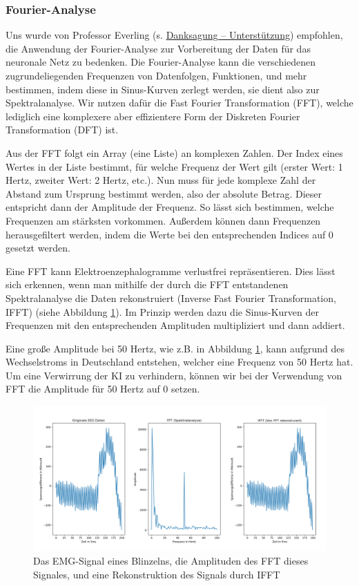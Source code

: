 \documentclass[11pt]{scrartcl}
\begin{document}
	\subsubsection{Fourier-Analyse}
	
	Uns wurde von Professor Everling (s. \hyperref[Unterstuetzung]{Danksagung -- Unterstützung}) empfohlen, die Anwendung der Fourier-Analyse zur Vorbereitung der Daten für das neuronale Netz zu bedenken. Die Fourier-Analyse kann die verschiedenen zugrundeliegenden Frequenzen von Datenfolgen, Funktionen, und mehr bestimmen, indem diese in Sinus-Kurven zerlegt werden, sie dient also zur Spektralanalyse. \cite{3b1b:fft} Wir nutzen dafür die Fast Fourier Transformation (FFT), welche lediglich eine komplexere aber effizientere Form der Diskreten Fourier Transformation (DFT) ist. \cite{FFT-DFT}

	Aus der FFT folgt ein Array (eine Liste) an komplexen Zahlen. Der Index eines Wertes in der Liste bestimmt, für welche Frequenz der Wert gilt (erster Wert: 1 Hertz, zweiter Wert: 2 Hertz, etc.). Nun muss für jede komplexe Zahl der Abstand zum Ursprung bestimmt werden, also der absolute Betrag. Dieser entspricht dann der Amplitude der Frequenz. So lässt sich bestimmen, welche Frequenzen am stärksten vorkommen. Außerdem können dann Frequenzen herausgefiltert werden, indem die Werte bei den entsprechenden Indices auf 0 gesetzt werden. 

	Eine FFT kann Elektroenzephalogramme verlustfrei repräsentieren. Dies lässt sich erkennen, wenn man mithilfe der durch die FFT entstandenen Spektralanalyse die Daten rekonstruiert (Inverse Fast Fourier Transformation, IFFT) (siehe Abbildung \ref{EEG-IFFT}). Im Prinzip werden dazu die Sinus-Kurven der Frequenzen mit den entsprechenden Amplituden multipliziert und dann addiert.

	Eine große Amplitude bei 50 Hertz, wie z.B. in Abbildung \ref{EEG-IFFT}, kann aufgrund des Wechselstroms in Deutschland entstehen, welcher eine Frequenz von 50 Hertz hat. \cite{Praktikum} Um eine Verwirrung der KI zu verhindern, können wir bei der Verwendung von FFT die Amplitude für 50 Hertz auf 0 setzen.

	\begin{figure}[h!]
		\includegraphics[width=\textwidth]{pictures/blink_fft_ifft.png}
		\caption{Das EMG-Signal eines Blinzelns, die Amplituden des FFT dieses Signales, und eine Rekonstruktion des Signals durch IFFT}
		\label{EEG-IFFT}
	\end{figure}
\end{document}
